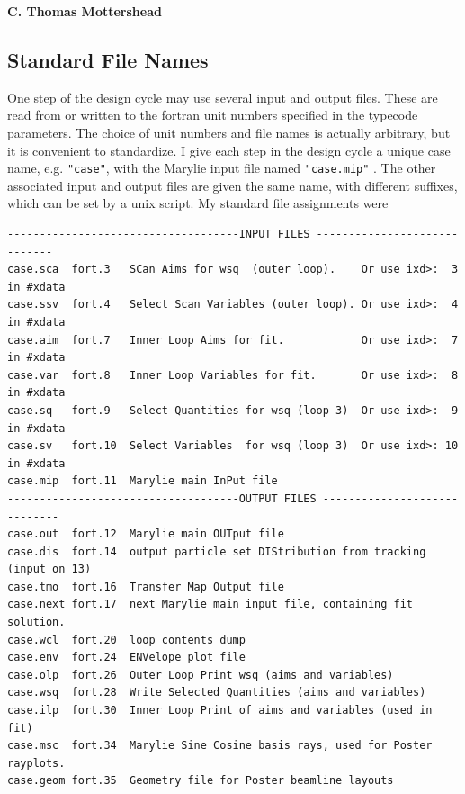 \documentclass[11pt]{article} %
\newcommand{\vb}{\verb ;}
\newcommand{\bvb}{\begin{verbatim}}
\begin{document}
\begin{center}  {\bf C. Thomas Mottershead }
\subsection {Standard File Names}
One step of the design cycle may use several input and output files. These are read from or written to the fortran unit numbers specified in the typecode parameters. The choice of unit numbers and file names is actually arbitrary, but it is convenient to standardize. I give each step in the design cycle a unique case name, e.g. \vb "case";, with the Marylie input file named \vb "case.mip"; . The other associated input and output files are given the same name, with different suffixes, which can be set by a unix script. My standard file assignments were
 \bvb 
------------------------------------INPUT FILES -----------------------------
case.sca  fort.3   SCan Aims for wsq  (outer loop).    Or use ixd>:  3 in #xdata
case.ssv  fort.4   Select Scan Variables (outer loop). Or use ixd>:  4 in #xdata
case.aim  fort.7   Inner Loop Aims for fit.            Or use ixd>:  7 in #xdata
case.var  fort.8   Inner Loop Variables for fit.       Or use ixd>:  8 in #xdata
case.sq   fort.9   Select Quantities for wsq (loop 3)  Or use ixd>:  9 in #xdata
case.sv   fort.10  Select Variables  for wsq (loop 3)  Or use ixd>: 10 in #xdata
case.mip  fort.11  Marylie main InPut file
------------------------------------OUTPUT FILES -----------------------------
case.out  fort.12  Marylie main OUTput file
case.dis  fort.14  output particle set DIStribution from tracking (input on 13)
case.tmo  fort.16  Transfer Map Output file
case.next fort.17  next Marylie main input file, containing fit solution.
case.wcl  fort.20  loop contents dump
case.env  fort.24  ENVelope plot file
case.olp  fort.26  Outer Loop Print wsq (aims and variables)
case.wsq  fort.28  Write Selected Quantities (aims and variables)
case.ilp  fort.30  Inner Loop Print of aims and variables (used in fit)
case.msc  fort.34  Marylie Sine Cosine basis rays, used for Poster rayplots.
case.geom fort.35  Geometry file for Poster beamline layouts

\end{verbatim}










\end{center}
\end{document}
